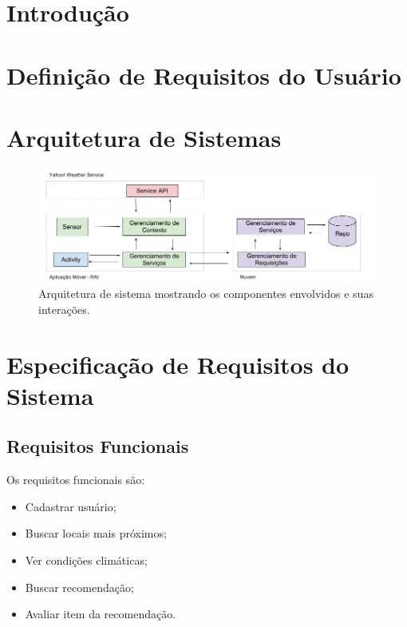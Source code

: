 \documentclass[11pt,a4paper,oneside]{article}
\begin{document}
\section{Introdução}

\section{Definição de Requisitos do Usuário}

\section{Arquitetura de Sistemas}

\begin{figure}
	\centering
	\includegraphics[width=\textwidth]{../figuras/arquitetura-rai.png}
	\caption{Arquitetura de sistema mostrando os componentes envolvidos e suas interações.}
	\label{fig:arquitetura-rai}
\end{figure}

\section{Especificação de Requisitos do Sistema}

\subsection{Requisitos Funcionais}
Os requisitos funcionais são:
\begin{itemize}
\item Cadastrar usuário;
\item Buscar locais mais próximos;
\item Ver condições climáticas;
\item Buscar recomendação;
\item Avaliar item da recomendação.
\end{itemize}
\end{document}
